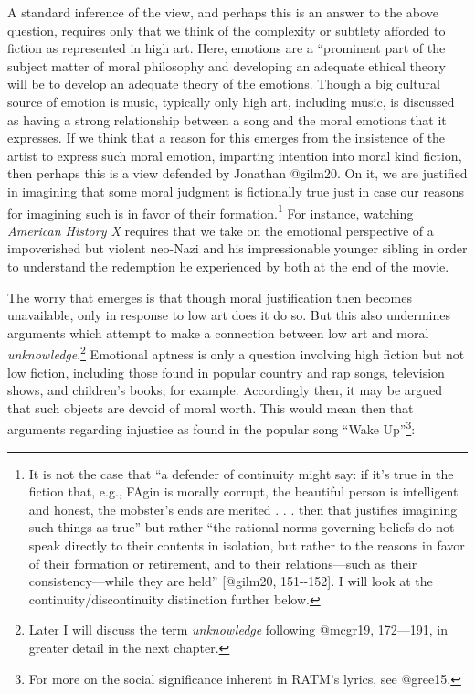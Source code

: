 \documentclass[
  letterpaper,
  DIV=11,
  numbers=noendperiod]{scrartcl}
\theoremstyle{remark}
\begin{document}
A standard inference of the view, and perhaps this is an answer to the
above question, requires only that we think of the complexity or
subtlety afforded to fiction as represented in high art. Here, emotions
are a ``prominent part of the subject matter of moral philosophy and
developing an adequate ethical theory will be to develop an adequate
theory of the emotions. Though a big cultural source of emotion is
music, typically only high art, including music, is discussed as having
a strong relationship between a song and the moral emotions that it
expresses. If we think that a reason for this emerges from the
insistence of the artist to express such moral emotion, imparting
intention into moral kind fiction, then perhaps this is a view defended
by Jonathan @gilm20. On it, we are justified in imagining that some
moral judgment is fictionally true just in case our reasons for
imagining such is in favor of their formation.\footnote{It is not the
  case that ``a defender of continuity might say: if it's true in the
  fiction that, e.g., FAgin is morally corrupt, the beautiful person is
  intelligent and honest, the mobster's ends are merited . . . then that
  justifies imagining such things as true'' but rather ``the rational
  norms governing beliefs do not speak directly to their contents in
  isolation, but rather to the reasons in favor of their formation or
  retirement, and to their relations---such as their consistency---while
  they are held'' {[}@gilm20, 151-\/-152{]}. I will look at the
  continuity/discontinuity distinction further below.} For instance,
watching \emph{American History X} requires that we take on the
emotional perspective of a impoverished but violent neo-Nazi and his
impressionable younger sibling in order to understand the redemption he
experienced by both at the end of the movie.

The worry that emerges is that though moral justification then becomes
unavailable, only in response to low art does it do so. But this also
undermines arguments which attempt to make a connection between low art
and moral \emph{unknowledge}.\footnote{Later I will discuss the term
  \emph{unknowledge} following @mcgr19, 172---191, in greater detail in
  the next chapter.} Emotional aptness is only a question involving high
fiction but not low fiction, including those found in popular country
and rap songs, television shows, and children's books, for example.
Accordingly then, it may be argued that such objects are devoid of moral
worth. This would mean then that arguments regarding injustice as found
in the popular song ``Wake Up''\footnote{For more on the social
  significance inherent in RATM's lyrics, see @gree15.}:
\end{document}
